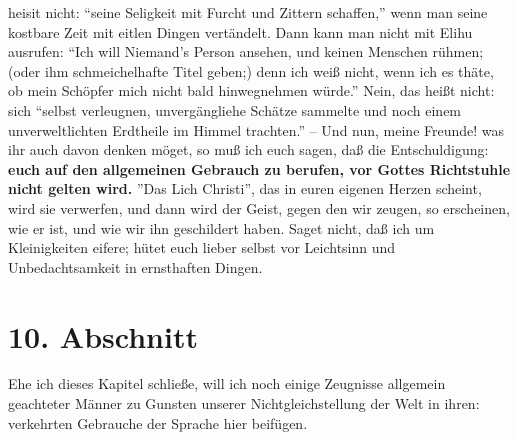 heisit nicht: "`seine Seligkeit mit Furcht und Zittern schaffen,"' wenn man
seine kostbare Zeit mit eitlen Dingen vertändelt. Dann kann man nicht mit Elihu
ausrufen: "`Ich will Niemand's Person ansehen, und keinen Menschen rühmen; (oder
ihm schmeichelhafte Titel geben;) denn ich weiß nicht, wenn ich es thäte, ob
mein Schöpfer mich nicht bald hinwegnehmen würde."' Nein, das heißt nicht: sich
"`selbst verleugnen, unvergängliehe Schätze sammelte und noch einem
unverweltlichten Erdtheile im Himmel trachten."' -- Und nun, meine Freunde! was
ihr auch davon denken möget, so muß ich euch sagen, daß die Entschuldigung: \textbf{euch
auf den allgemeinen Gebrauch zu berufen, vor Gottes Richtstuhle nicht gelten
wird.} ''Das Lich Christi'', das in euren eigenen Herzen scheint, wird sie
verwerfen, und dann wird der Geist, gegen den wir zeugen, so erscheinen, wie er
ist, und wie wir ihn geschildert haben. Saget nicht, daß ich um Kleinigkeiten
eifere; hütet euch lieber selbst vor Leichtsinn und Unbedachtsamkeit in
ernsthaften Dingen.

\section{10. Abschnitt} \label{kap10_ab10}

Ehe ich dieses Kapitel schließe, will ich noch einige Zeugnisse allgemein
geachteter Männer zu Gunsten unserer Nichtgleichstellung der Welt in ihren:
verkehrten Gebrauche der Sprache hier beifügen.

\medskip

